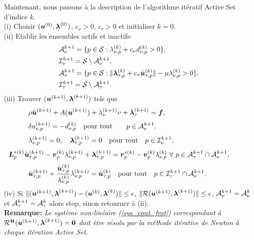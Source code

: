 Maintenant, nous passons à la description de l'algorithme itératif Active Set d'indice $k$.\\
\qquad(i) Choisir $(\mbox{\boldmath{$u$}}^{(0)},\mbox{\boldmath{$\lambda$}}^{(0)})$, $c_{\nu}>0$, $c_\tau>0$ et initialiser $k=0$.\\[3mm]
\qquad(ii) Etablir les ensembles actifs et inactifs:
\begin{align*}
&{\cal A}_{\nu}^{k+1}=\{p\in {\cal S}:\lambda^{(k)}_{\nu,p}+c_{\nu} d^{(k)}_{\nu,p}> 0\},\\
&{\cal I}_{\nu}^{k+1}={\cal S}\setminus {\cal A}_{\nu}^{k+1},\\
&{\cal A}_{\tau}^{k+1}=\{p\in {\cal S}:\|\mbox{\boldmath{$\lambda$}}_{\tau, p}^{(k)}+c_\tau \dot{\mbox{\boldmath{$u$}}}_{\tau, p}^{(k)}\|-\mu \lambda_{\nu, p}^{(k)}> 0\},\\
&{\cal I}_{\tau}^{k+1}={\cal S}\setminus {\cal A}_{\tau}^{k+1}.
\end{align*}
(iii) Trouver $(\mbox{\boldmath{$u$}}^{(k+1) },\mbox{\boldmath{$\lambda$}}^{(k+1) })$ tels que
\begin{eqnarray}
& \label{sys_cont_frot} \rho\ddot{\bu}^{(k+1)} + A(\bu^{(k+1)}) + \lambda_{\nu}^{(k+1)}\nu + \blambda_{\tau}^{(k+1)}= \fb, \\[1mm]
&\label{Anu}\delta u^{(k+1)}_{\nu,p} = -d^{(k)}_{\nu,p} \quad {\rm pour \ tout} \qquad p\in {\cal A}_{\nu}^{k+1},\\[1mm]
&\label{Inu}\lambda^{(k+1)}_{\nu,p}=0, \quad \blambda^{(k+1)}_{\tau,p}=0 \quad {\rm pour \ tout} \quad p\in {\cal I}_{\nu}^{k+1},\\[1mm]
&\hspace{-1.0cm}\label{Atau}\bL_p^{*(k)}\dot\bu_{\tau, p}^{(k+1)}-\bv_p^{(k)}\lambda_{\nu, p}^{(k+1)}+\blambda_{\tau, p}^{(k+1)}=\br_p^{*(k)}-\bv_p^{(k)}\lambda_{\nu, p}^{(k)} \ \forall \ p\in {\cal A}_{\tau}^{k+1}\cap {\cal A}_{\nu}^{k+1},\\[1mm]
&\label{Itau}\dot\bu_{\tau, p}^{(k+1)}+\frac{\dot\bu_{\tau, p}^{(k)}}{\lambda_{\nu, p}^{(k)}}\lambda_{\nu, p}^{(k+1)} =\dot\bu_{\tau, p}^{(k)} \quad {\rm pour \ tout} \quad p\in {\cal I}_{\tau}^{k+1}\cap {\cal A}_{\nu}^{k+1}.
\end{eqnarray}
(iv) Si $\|(\mbox{\boldmath{$u$}}^{(k+1) },\mbox{\boldmath{$\lambda$}}^{(k+1)})-(\mbox{\boldmath{$u$}}^{(k) },\mbox{\boldmath{$\lambda$}}^{(k)})\|\leq\epsilon$, $\|{\cal R}(\mbox{\boldmath{$u$}}^{(k+1) },\mbox{\boldmath{$\lambda$}}^{(k+1)})\|\leq\epsilon$, ${\cal A}_{\nu}^{k+1}={\cal A}_{\nu}^{k}$ et ${\cal A}_{\tau}^{k+1}={\cal A}_{\tau}^{k}$ alors stop, sinon retourner à (ii).\\[1mm]
{\bf Remarque:} \textit{Le système non-linéaire (\ref{sys_cont_frot}) correspondant à ${\cal R}^{\mbox{\boldmath{$u$}}}(\mbox{\boldmath{$u$}}^{(k+1)},\mbox{\boldmath{$\lambda$}}^{(k+1)})=\mbox{\boldmath{$0$}}$ doit être résolu par la méthode itérative de Newton à chaque itération Active Set.}\\

